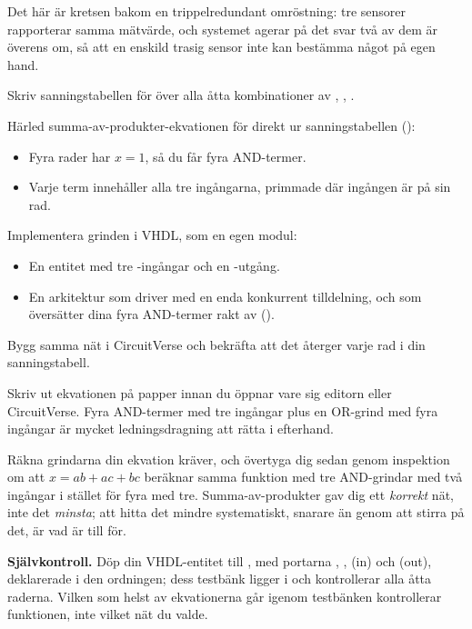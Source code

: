 Det här är kretsen bakom en trippelredundant omröstning: tre sensorer rapporterar samma mätvärde,
och systemet agerar på det svar två av dem är överens om, så att en enskild trasig sensor inte kan
bestämma något på egen hand.

 Skriv sanningstabellen för  över alla åtta kombinationer av , ,
.

 Härled summa-av-produkter-ekvationen för  direkt ur sanningstabellen
():
\begin{itemize}
  \item Fyra rader har $x = 1$, så du får fyra AND-termer.
  \item Varje term innehåller alla tre ingångarna, primmade där ingången är  på sin rad.
\end{itemize}

 Implementera grinden i VHDL, som en egen modul:
\begin{itemize}
  \item En entitet med tre -ingångar och en -utgång.
  \item En arkitektur som driver  med en enda konkurrent tilldelning, och som översätter
    dina fyra AND-termer rakt av ().
\end{itemize}

 Bygg samma nät i CircuitVerse och bekräfta att det återger varje rad i din
sanningstabell.

\note[Tips]Skriv ut ekvationen på papper innan du öppnar vare sig editorn eller CircuitVerse. Fyra
AND-termer med tre ingångar plus en OR-grind med fyra ingångar är mycket ledningsdragning att
rätta i efterhand.

Räkna grindarna din ekvation kräver, och övertyga dig sedan genom inspektion om
att $x = ab + ac + bc$ beräknar samma funktion med tre AND-grindar med två ingångar i stället för
fyra med tre. Summa-av-produkter gav dig ett \emph{korrekt} nät, inte det \emph{minsta}; att hitta
det mindre systematiskt, snarare än genom att stirra på det, är vad  är till för.


\begin{selfcheck}
\textbf{Självkontroll.} Döp din VHDL-entitet till , med portarna ,
,  (in) och  (out), deklarerade i den ordningen; dess testbänk ligger i
 och kontrollerar alla åtta raderna. Vilken som helst av ekvationerna
går igenom \textemdash{} testbänken kontrollerar funktionen, inte vilket nät du valde.
\end{selfcheck}

